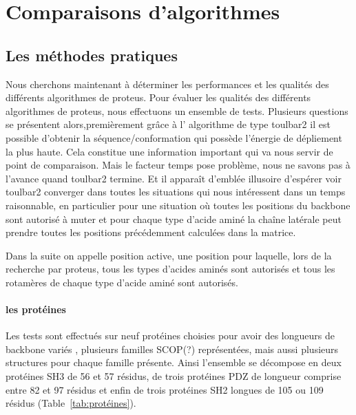 \chapter{Comparaisons d'algorithmes}
\label{chap:resultats_comparaisons}


\section{Les méthodes pratiques} 

Nous cherchons maintenant à déterminer les performances et les qualités des différents algorithmes de proteus.
Pour évaluer les qualités des différents algorithmes de proteus, nous effectuons un ensemble de tests. 
Plusieurs questions se présentent alors,premièrement grâce à l' algorithme de type toulbar2 il est possible d'obtenir la séquence/conformation qui possède l'énergie de dépliement la plus haute. Cela constitue une information important qui va nous servir de point de comparaison. Mais le facteur temps pose problème, nous ne savons pas à l'avance quand toulbar2 termine. Et il apparaît d'emblée illusoire d'espérer voir toulbar2 converger dans toutes les situations qui nous intéressent dans un temps raisonnable, en particulier pour une situation où  toutes les positions du  backbone sont autorisé à muter et pour chaque type d'acide aminé la chaîne latérale peut prendre toutes les positions précédemment calculées dans la matrice. 


Dans la suite on appelle position active, une position pour laquelle, lors de la recherche par proteus, tous les types d'acides aminés sont autorisés et tous les rotamères de chaque type d'acide aminé sont autorisés.


\subsubsection{les protéines}
 
Les tests sont effectués sur neuf protéines choisies pour avoir des longueurs de backbone variés , plusieurs familles SCOP(?) représentées, mais aussi plusieurs structures pour chaque famille présente. Ainsi l'ensemble se décompose en deux protéines SH3 de 56 et 57 résidus, de trois protéines PDZ de longueur comprise entre 82 et 97 résidus  et enfin de trois protéines SH2  longues de 105 ou 109 résidus (Table~\ref{tab:protéines}).  


